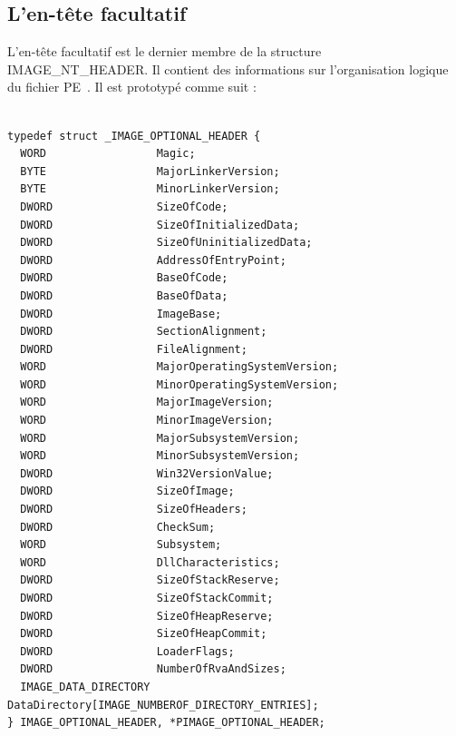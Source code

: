 \subsection{L'en-tête facultatif}

L'en-tête facultatif est le dernier membre de la structure IMAGE\_NT\_HEADER. Il contient des informations sur l'organisation logique du fichier PE~\cite{PE}.
Il est prototypé comme suit :
\begin{lstlisting}

typedef struct _IMAGE_OPTIONAL_HEADER {
  WORD                 Magic;
  BYTE                 MajorLinkerVersion;
  BYTE                 MinorLinkerVersion;
  DWORD                SizeOfCode;
  DWORD                SizeOfInitializedData;
  DWORD                SizeOfUninitializedData;
  DWORD                AddressOfEntryPoint;
  DWORD                BaseOfCode;
  DWORD                BaseOfData;
  DWORD                ImageBase;
  DWORD                SectionAlignment;
  DWORD                FileAlignment;
  WORD                 MajorOperatingSystemVersion;
  WORD                 MinorOperatingSystemVersion;
  WORD                 MajorImageVersion;
  WORD                 MinorImageVersion;
  WORD                 MajorSubsystemVersion;
  WORD                 MinorSubsystemVersion;
  DWORD                Win32VersionValue;
  DWORD                SizeOfImage;
  DWORD                SizeOfHeaders;
  DWORD                CheckSum;
  WORD                 Subsystem;
  WORD                 DllCharacteristics;
  DWORD                SizeOfStackReserve;
  DWORD                SizeOfStackCommit;
  DWORD                SizeOfHeapReserve;
  DWORD                SizeOfHeapCommit;
  DWORD                LoaderFlags;
  DWORD                NumberOfRvaAndSizes;
  IMAGE_DATA_DIRECTORY DataDirectory[IMAGE_NUMBEROF_DIRECTORY_ENTRIES];
} IMAGE_OPTIONAL_HEADER, *PIMAGE_OPTIONAL_HEADER;
\end{lstlisting}


